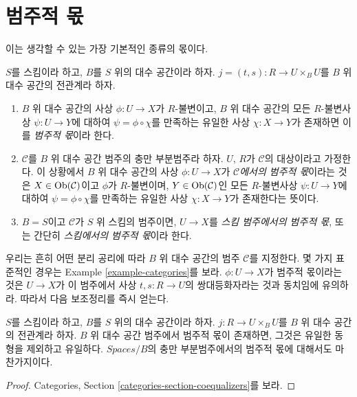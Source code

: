 \section{범주적 몫}
\label{section-categorical}

\noindent
이는 생각할 수 있는 가장 기본적인 종류의 몫이다.

\begin{definition}
\label{definition-categorical}
$S$를 스킴이라 하고, $B$를 $S$ 위의 대수 공간이라 하자.
$j = (t, s) : R \to U \times_B U$를 $B$ 위 대수 공간의 전관계라 하자.
\begin{enumerate}
\item $B$ 위 대수 공간의 사상 $\phi : U \to X$가 $R$-불변이고,
$B$ 위 대수 공간의 모든 $R$-불변사상 $\psi : U \to Y$에 대하여
$\psi = \phi \circ \chi$를 만족하는 유일한 사상 $\chi : X \to Y$가
존재하면 이를 {\it 범주적 몫}이라 한다.
\item $\mathcal{C}$를 $B$ 위 대수 공간 범주의 충만 부분범주라 하자.
$U$, $R$가 $\mathcal{C}$의 대상이라고 가정한다. 이 상황에서
$B$ 위 대수 공간의 사상 $\phi : U \to X$가
{\it $\mathcal{C}$에서의 범주적 몫}이라는 것은
$X \in \mathop{\mathrm{Ob}}\nolimits(\mathcal{C})$이고 $\phi$가 $R$-불변이며,
$Y \in \mathop{\mathrm{Ob}}\nolimits(\mathcal{C})$인 모든 $R$-불변사상
$\psi : U \to Y$에 대하여
$\psi = \phi \circ \chi$를 만족하는 유일한 사상 $\chi : X \to Y$가
존재한다는 뜻이다.
\item $B = S$이고 $\mathcal{C}$가 $S$ 위 스킴의 범주이면,
$U \to X$를 {\it 스킴 범주에서의 범주적 몫}, 또는 간단히
{\it 스킴에서의 범주적 몫}이라 한다.
\end{enumerate}
\end{definition}

\noindent
우리는 흔히 어떤 분리 공리에 따라 $B$ 위 대수 공간의 범주
$\mathcal{C}$를 지정한다. 몇 가지 표준적인 경우는
Example \ref{example-categories}를 보라.
$\phi : U \to X$가 범주적 몫이라는 것은 $U \to X$가 이 범주에서
사상 $t, s : R \to U$의 쌍대등화자라는 것과 동치임에 유의하라.
따라서 다음 보조정리를 즉시 얻는다.

\begin{lemma}
\label{lemma-categorical-unique}
$S$를 스킴이라 하고, $B$를 $S$ 위의 대수 공간이라 하자.
$j : R \to U \times_B U$를 $B$ 위 대수 공간의 전관계라 하자.
$B$ 위 대수 공간 범주에서 범주적 몫이 존재하면, 그것은
유일한 동형을 제외하고 유일하다. $\textit{Spaces}/B$의 충만
부분범주에서의 범주적 몫에 대해서도 마찬가지이다.
\end{lemma}

\begin{proof}
Categories, Section \ref{categories-section-coequalizers}를 보라.
\end{proof}

